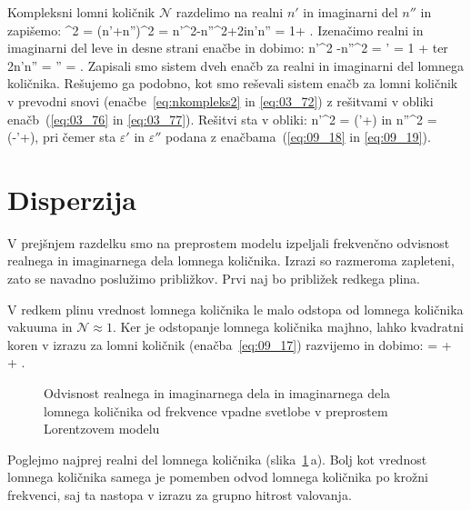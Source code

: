 Kompleksni lomni količnik $\mathcal{N}$ razdelimo na realni $n'$ in imaginarni del $n''$ in 
zapišemo:
\beq
{}^2 = (n'+n'')^2 = n'^2-n''^2+2in'n'' =  1+ .
\label{eq:09_17}
\eeq
Izenačimo realni in imaginarni del leve in desne strani enačbe in dobimo:
\beq
n'^2 -n''^2 = \varepsilon' = 1 + 
\label{eq:09_18}
\eeq
ter 
\beq
2n'n'' = \varepsilon'' = .
\label{eq:09_19}
\eeq
Zapisali smo sistem dveh enačb za realni in imaginarni del lomnega količnika. Rešujemo ga podobno, kot
smo reševali sistem enačb za lomni količnik v prevodni snovi (enačbe~\ref{eq:nkompleks2} in \ref{eq:03_72})
z rešitvami v obliki enačb~(\ref{eq:03_76} in \ref{eq:03_77}). Rešitvi sta v obliki:
\beq
n'^2 = \left(\varepsilon'+\right)
\label{eq:09_20}
\eeq
in
\beq
n''^2 = \left(-\varepsilon'+\right)\!,
\label{eq:09_21}
\eeq
pri čemer sta $\varepsilon'$ in $\varepsilon''$ podana z enačbama~(\ref{eq:09_18} in \ref{eq:09_19}).

\section{Disperzija}
V prejšnjem razdelku smo na preprostem modelu izpeljali frekvenčno odvisnost realnega in imaginarnega
dela lomnega količnika. Izrazi so razmeroma zapleteni, zato se navadno poslužimo približkov. Prvi naj 
bo približek redkega plina. 

V redkem plinu vrednost lomnega količnika le malo odstopa od lomnega količnika vakuuma 
in $\mathcal{N} \approx 1$. Ker je odstopanje lomnega količnika majhno, lahko kvadratni koren v izrazu
za lomni količnik (enačba~\ref{eq:09_17}) razvijemo in dobimo:
\beq
{} =   +  + .
\label{eq:09_22}
\eeq
\begin{figure}[h!]
\centering
\def\svgwidth{100truemm} 
%
\caption{Odvisnost realnega in imaginarnega dela in imaginarnega dela lomnega količnika od frekvence
vpadne svetlobe v preprostem Lorentzovem modelu}
\label{fig:09_nkompelks}
\end{figure}
Poglejmo najprej realni del lomnega količnika (slika~\ref{fig:09_nkompelks}\,a). Bolj kot vrednost
lomnega količnika samega je pomemben odvod lomnega količnika po krožni frekvenci, saj ta nastopa v izrazu
za grupno hitrost valovanja. 

